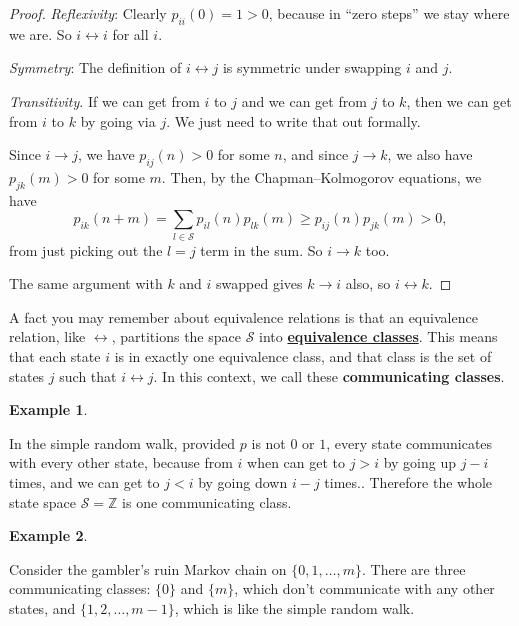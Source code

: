 \documentclass[
  a4paper,
]{article}
\theoremstyle{definition}
\theoremstyle{definition}
\newtheorem{example}{Example}[section]
\theoremstyle{definition}
\theoremstyle{remark}
\begin{document}
\begin{proof}

\emph{Reflexivity}: Clearly \(p_{ii}(0) = 1 > 0\), because in ``zero steps'' we stay where we are. So \(i \leftrightarrow i\) for all \(i\).

\emph{Symmetry}: The definition of \(i \leftrightarrow j\) is symmetric under swapping \(i\) and \(j\).

\emph{Transitivity}. If we can get from \(i\) to \(j\) and we can get from \(j\) to \(k\), then we can get from \(i\) to \(k\) by going via \(j\). We just need to write that out formally.

Since \(i \to j\), we have \(p_{ij}(n) > 0\) for some \(n\), and since \(j \to k\), we also have \(p_{jk}(m) > 0\) for some \(m\). Then, by the Chapman--Kolmogorov equations, we have
\[ p_{ik}(n+m) = \sum_{l \in \mathcal S} p_{il}(n) p_{lk}(m) \geq p_{ij}(n) p_{jk}(m) > 0 , \]
from just picking out the \(l=j\) term in the sum. So \(i \to k\) too.

The same argument with \(k\) and \(i\) swapped gives \(k \to i\) also, so \(i \leftrightarrow k\).

\end{proof}

A fact you may remember about equivalence relations is that an equivalence relation, like \(\leftrightarrow\), partitions the space \(\mathcal S\) into \href{https://en.wikipedia.org/wiki/Equivalence_class}{\textbf{equivalence classes}}. This means that each state \(i\) is in exactly one equivalence class, and that class is the set of states \(j\) such that \(i \leftrightarrow j\). In this context, we call these \textbf{communicating classes}.

\begin{example}
\protect\hypertarget{exm:rw-class}{}\label{exm:rw-class}

In the simple random walk, provided \(p\) is not \(0\) or \(1\), every state communicates with every other state, because from \(i\) when can get to \(j > i\) by going up \(j - i\) times, and we can get to \(j < i\) by going down \(i - j\) times.. Therefore the whole state space \(\mathcal S = \mathbb Z\) is one communicating class.

\end{example}

\begin{example}
\protect\hypertarget{exm:gamblers-class}{}\label{exm:gamblers-class}

Consider the gambler's ruin Markov chain on \(\{0,1,\dots,m\}\). There are three communicating classes: \(\{0\}\) and \(\{m\}\), which don't communicate with any other states, and \(\{1,2,\dots,m-1\}\), which is like the simple random walk.

\end{example}
\end{document}
